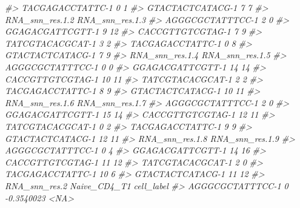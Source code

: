 \documentclass[
]{book}
\newenvironment{Shaded}{\begin{snugshade}}{\end{snugshade}}
\newcommand{\CommentTok}[1]{\textcolor[rgb]{0.56,0.35,0.01}{\textit{#1}}}
\begin{document}
\begin{Shaded}
\begin{Highlighting}[]
\CommentTok{\#\textgreater{} TACGAGACCTATTC{-}1             0               1}
\CommentTok{\#\textgreater{} GTACTACTCATACG{-}1             7               7}
\CommentTok{\#\textgreater{}                  RNA\_snn\_res.1.2 RNA\_snn\_res.1.3}
\CommentTok{\#\textgreater{} AGGGCGCTATTTCC{-}1               2               0}
\CommentTok{\#\textgreater{} GGAGACGATTCGTT{-}1               9              12}
\CommentTok{\#\textgreater{} CACCGTTGTCGTAG{-}1               7               9}
\CommentTok{\#\textgreater{} TATCGTACACGCAT{-}1               3               2}
\CommentTok{\#\textgreater{} TACGAGACCTATTC{-}1               0               8}
\CommentTok{\#\textgreater{} GTACTACTCATACG{-}1               7               9}
\CommentTok{\#\textgreater{}                  RNA\_snn\_res.1.4 RNA\_snn\_res.1.5}
\CommentTok{\#\textgreater{} AGGGCGCTATTTCC{-}1               0               0}
\CommentTok{\#\textgreater{} GGAGACGATTCGTT{-}1              14              14}
\CommentTok{\#\textgreater{} CACCGTTGTCGTAG{-}1              10              11}
\CommentTok{\#\textgreater{} TATCGTACACGCAT{-}1               2               2}
\CommentTok{\#\textgreater{} TACGAGACCTATTC{-}1               8               9}
\CommentTok{\#\textgreater{} GTACTACTCATACG{-}1              10              11}
\CommentTok{\#\textgreater{}                  RNA\_snn\_res.1.6 RNA\_snn\_res.1.7}
\CommentTok{\#\textgreater{} AGGGCGCTATTTCC{-}1               2               0}
\CommentTok{\#\textgreater{} GGAGACGATTCGTT{-}1              15              14}
\CommentTok{\#\textgreater{} CACCGTTGTCGTAG{-}1              12              11}
\CommentTok{\#\textgreater{} TATCGTACACGCAT{-}1               0               2}
\CommentTok{\#\textgreater{} TACGAGACCTATTC{-}1               9               9}
\CommentTok{\#\textgreater{} GTACTACTCATACG{-}1              12              11}
\CommentTok{\#\textgreater{}                  RNA\_snn\_res.1.8 RNA\_snn\_res.1.9}
\CommentTok{\#\textgreater{} AGGGCGCTATTTCC{-}1               0               4}
\CommentTok{\#\textgreater{} GGAGACGATTCGTT{-}1              14              16}
\CommentTok{\#\textgreater{} CACCGTTGTCGTAG{-}1              11              12}
\CommentTok{\#\textgreater{} TATCGTACACGCAT{-}1               2               0}
\CommentTok{\#\textgreater{} TACGAGACCTATTC{-}1              10               6}
\CommentTok{\#\textgreater{} GTACTACTCATACG{-}1              11              12}
\CommentTok{\#\textgreater{}                  RNA\_snn\_res.2 Naive\_CD4\_T1  cell\_label}
\CommentTok{\#\textgreater{} AGGGCGCTATTTCC{-}1             0   {-}0.3540023        \textless{}NA\textgreater{}}

\end{Highlighting}
\end{Shaded}
\end{document}
